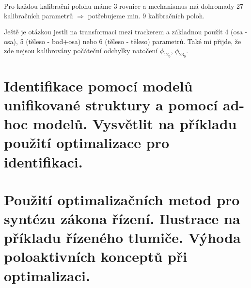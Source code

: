 \documentclass{article}
\begin{document}
	Pro každou kalibrační polohu máme 3 rovnice a mechanismus má dohromady 27 kalibračních parametrů $\Rightarrow$ potřebujeme min. 9 kalibračních poloh.

	Ještě je otázkou jestli na transformaci mezi trackerem a základnou použít 4 (osa - osa), 5 (těleso - bod+osa) nebo 6 (těleso - těleso) parametrů. Také mi přijde, že zde nejsou kalibrovány počáteční odchylky natočení $\phi_{12_0}$, $\phi_{23_0}$.

	\section{Identifikace pomocí modelů unifikované struktury a pomocí ad-hoc modelů. Vysvětlit na příkladu použití optimalizace pro identifikaci.}

	\section{Použití optimalizačních metod pro syntézu zákona řízení. Ilustrace na příkladu řízeného tlumiče. Výhoda poloaktivních konceptů při optimalizaci.}
\end{document}
